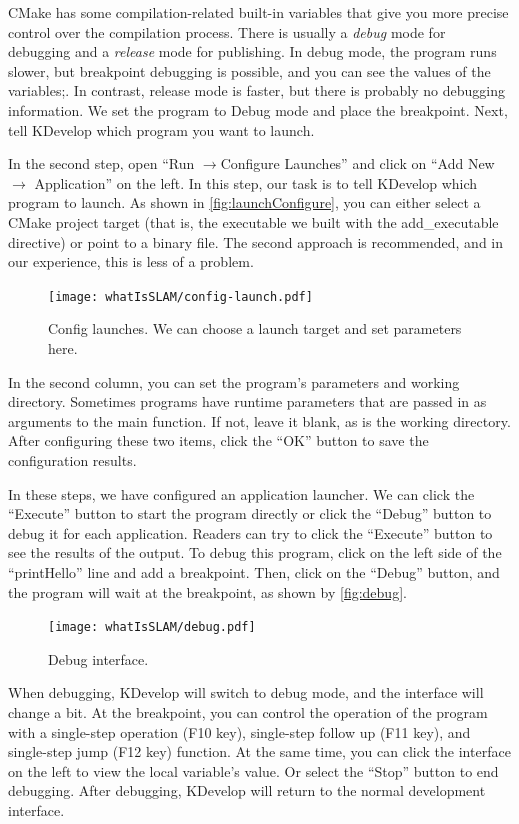 CMake has some compilation-related built-in variables that give you more precise control over the compilation process. There is usually a \textit{debug} mode for debugging and a \textit{release} mode for publishing. In debug mode, the program runs slower, but breakpoint debugging is possible, and you can see the values of the variables;. In contrast, release mode is faster, but there is probably no debugging information. We set the program to Debug mode and place the breakpoint. Next, tell KDevelop which program you want to launch.

In the second step, open ``Run $\rightarrow$Configure Launches'' and click on ``Add New $\rightarrow$ Application'' on the left. In this step, our task is to tell KDevelop which program to launch. As shown in \autoref{fig:launchConfigure}, you can either select a CMake project target (that is, the executable we built with the add\_executable directive) or point to a binary file. The second approach is recommended, and in our experience, this is less of a problem.

\begin{figure}[!ht]
    \centering
    \texttt{[image: whatIsSLAM/config-launch.pdf]}
    \caption{Config launches. We can choose a launch target and set parameters here. }
    \label{fig:launchConfigure}
\end{figure}

In the second column, you can set the program's parameters and working directory. Sometimes programs have runtime parameters that are passed in as arguments to the main function. If not, leave it blank, as is the working directory. After configuring these two items, click the ``OK'' button to save the configuration results.

In these steps, we have configured an application launcher. We can click the ``Execute'' button to start the program directly or click the ``Debug'' button to debug it for each application. Readers can try to click the ``Execute'' button to see the results of the output. To debug this program, click on the left side of the ``printHello'' line and add a breakpoint. Then, click on the ``Debug'' button, and the program will wait at the breakpoint, as shown by \autoref{fig:debug}.

\begin{figure}[!htp]
    \centering
    \texttt{[image: whatIsSLAM/debug.pdf]}
    \caption{Debug interface. }
    \label{fig:debug}
\end{figure}

When debugging, KDevelop will switch to debug mode, and the interface will change a bit. At the breakpoint, you can control the operation of the program with a single-step operation (F10 key), single-step follow up (F11 key), and single-step jump (F12 key) function. At the same time, you can click the interface on the left to view the local variable's value. Or select the ``Stop'' button to end debugging. After debugging, KDevelop will return to the normal development interface.

